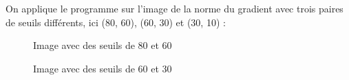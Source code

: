 \documentclass[french,a4paper,10pt]{article}
\begin{document}
    On applique le programme sur l'image de la norme du gradient avec trois paires de seuils différents,
    ici (80, 60), (60, 30) et (30, 10) : %
    \begin{figure}[!htb]
        \begin{minipage}{0.3\textwidth}
            \centering
            \caption{Image avec des seuils de 80 et 60}\label{Fig:hysteresis-80-60-peppers-grey}
        \end{minipage}\hfill
        \begin{minipage}{0.3\textwidth}
            \centering
            \caption{Image avec des seuils de 60 et 30}\label{Fig:hysteresis-60-30-peppers-grey}

\end{minipage}
\end{figure}
\end{document}
